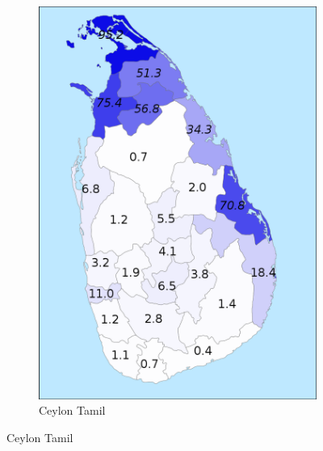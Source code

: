 \documentclass{article}
\begin{document}
\begin{figure}
\begin{center}
\begin{subfigure}[b]{.4\textwidth}{ 
 \includegraphics[width=\textwidth]{SriLankaNativeTamil.png}
\caption{Ceylon Tamil}
}
\end{subfigure}

\end{center}
\end{figure}
\end{document}
